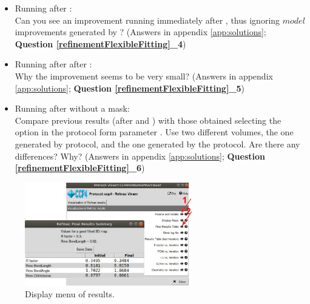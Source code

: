   \begin{itemize}
   \item Running  after \coot:\\
   Can you see an improvement running  immediately after \coot, thus ignoring $model$ improvements generated by \phenix {}? (Answers in appendix \ref{app:solutions}; \textbf{Question \ref{refinementFlexibleFitting}\_4})\\
   \item Running  after \phenix {} after \coot:\\
   Why the improvement seems to be very small? (Answers in appendix \ref{app:solutions}; \textbf{Question \ref{refinementFlexibleFitting}\_5})\\
   \item Running  after \phenix {} without a mask:\\
   Compare previous  results (after \coot and \phenix {}) with those obtained selecting the option  in the protocol form parameter . Use two different volumes, the one generated by \coot protocol, and the one generated by the  protocol. Are there any differences? Why? (Answers in appendix \ref{app:solutions}; \textbf{Question \ref{refinementFlexibleFitting}\_6})\\
  \end{itemize}
  
  \begin{figure}[H]
  \centering 
  \captionsetup{width=.9\linewidth} 
  \includegraphics[width=0.65\textwidth]{Images/Fig32}
  \caption{Display menu of  results.}
  \label{fig:refmac_display_results}
  \end{figure}
  
